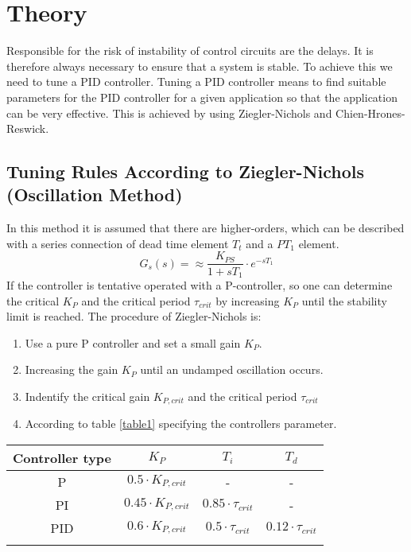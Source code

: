 \section{Theory}
Responsible for the risk of instability of control circuits are the delays. It is therefore always necessary to ensure that a system is stable. To achieve this we need to tune a PID controller.
Tuning a PID controller means to find suitable parameters for the PID controller for a given application so that the application can be very effective. This is achieved by using  Ziegler-Nichols and Chien-Hrones-Reswick.

\subsection{Tuning Rules According to Ziegler-Nichols (Oscillation Method)}
In this method it is assumed that there are higher-orders, which can be described with a series connection of dead time element $T_{t}$ and a $PT_{1}$ element.
\begin{equation}
G_{s}(s) =  \approx \frac{K_{PS}}{1+sT_{1}} \cdot e^{-sT_{1}}
\end{equation}
If the controller is tentative operated with a P-controller, so one can determine the critical $K_{P}$ and the critical period $\tau_{crit}$ by increasing $K_{P}$ until the stability limit is reached.
The procedure of Ziegler-Nichols is:
\begin{enumerate}
\item Use a pure P controller and set a small gain $K_{P}$.
\item Increasing the gain $K_{P}$ until an undamped oscillation occurs.
\item Indentify the critical gain $K_{P,crit}$ and the critical period $\tau_{crit}$
\item According to table \ref{table1} specifying the controllers parameter.
\end{enumerate}

\begin{center}
\begin{tabular}{|c|c|c|c|}
\hline
Controller type & $K_{P}$ & $T_{i}$ & $T_{d}$ \\ \hline
P & $0.5 \cdot K_{P,crit}$ & - & - \\ \hline
PI & $0.45 \cdot K_{P,crit}$ & $0.85 \cdot \tau_{crit}$  & - \\ \hline
PID & $0.6 \cdot K_{P,crit}$ & $0.5 \cdot \tau_{crit}$ & $0.12 \cdot \tau_{crit}$ \\\hline

	\label{table1}
\end{tabular}
\end{center}

